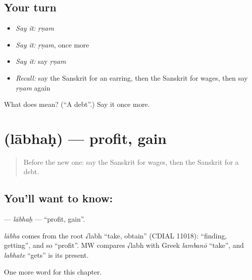 \subsection*{Your turn}
\begin{itemize}
\raggedright
  \item \emph{Say it:} \emph{ṛṇam}
  \item \emph{Say it:} \emph{ṛṇam}, once more
  \item \emph{Say it:} say \emph{ṛṇam}
  \item \emph{Recall:} say the Sanskrit for an earring, then the Sanskrit for wages, then say \emph{ṛṇam} again
\end{itemize}

\begin{tcolorbox}[breakable,colback=teal!4,colframe=teal!35!black,title={Before you move on}]
What does  mean? (\textquotedblleft{}A debt\textquotedblright{}.) Say it once more.
\end{tcolorbox}
\section[\texorpdfstring{\sk{लाभः} (lābhaḥ)}{लाभः (lābhaḥ)}]{ (lābhaḥ) — profit, gain}

\label{lesson:SA-C162-labhah}



\begin{quote}
Before the new one: say the Sanskrit for wages, then the Sanskrit for a debt.
\end{quote}

\subsection*{You'll want to know: }
\textbf{} — \emph{lābhaḥ} — \textquotedblleft{}profit, gain\textquotedblright{}.

\begin{cousinweb}
\emph{lābha} comes from the root √labh \textquotedblleft{}take, obtain\textquotedblright{} (CDIAL 11018): \textquotedblleft{}finding, getting\textquotedblright{}, and so \textquotedblleft{}profit\textquotedblright{}. MW compares √labh with Greek \emph{lambanō} \textquotedblleft{}take\textquotedblright{}, and \emph{labhate} \textquotedblleft{}gets\textquotedblright{} is its present.
\end{cousinweb}

\begin{grammarlens}[title={What you've built}]
One more word for this chapter.
\end{grammarlens}

